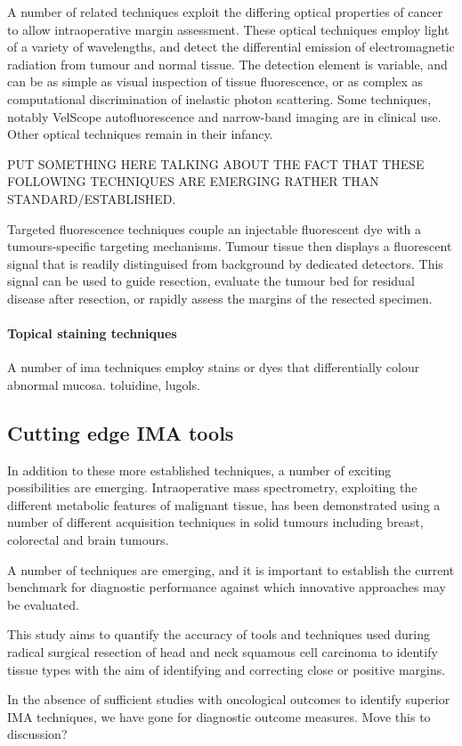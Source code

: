 A number of related techniques exploit the differing optical properties of cancer to allow intraoperative margin assessment.
These optical techniques employ light of a variety of wavelengths, and detect the differential emission of electromagnetic radiation from tumour and normal tissue. 
The detection element is variable, and can be as simple as visual inspection of tissue fluorescence, or as complex as computational discrimination of inelastic photon scattering.
Some techniques, notably VelScope autofluorescence and narrow-band imaging are in clinical use.
Other optical techniques remain in their infancy.

PUT SOMETHING HERE TALKING ABOUT THE FACT THAT THESE FOLLOWING TECHNIQUES ARE EMERGING RATHER THAN STANDARD/ESTABLISHED.

Targeted fluorescence techniques couple an injectable fluorescent dye with a tumours-specific targeting mechanisms.
Tumour tissue then displays a fluorescent signal that is readily distinguised from background by dedicated detectors.
This signal can be used to guide resection, evaluate the tumour bed for residual disease after resection, or rapidly assess the margins of the resected specimen.

\paragraph{Topical staining techniques}
A number of \gls{ima} techniques employ stains or dyes that differentially colour abnormal mucosa.
toluidine, lugols.


\subsection{Cutting edge IMA tools}
In addition to these more established techniques, a number of exciting possibilities are emerging. 
Intraoperative mass spectrometry, exploiting the different metabolic features of malignant tissue, has been demonstrated using a number of different acquisition techniques in solid tumours including breast, colorectal and brain tumours.

A number of techniques are emerging, and it is important to establish the current benchmark for diagnostic performance against which innovative approaches may be evaluated.

This study aims to quantify the accuracy of tools and techniques used during radical surgical resection of head and neck squamous cell carcinoma to identify tissue types with the aim of identifying and correcting close or positive margins.

In the absence of sufficient studies with oncological outcomes to identify superior IMA techniques, we have gone for diagnostic outcome measures. Move this to discussion?
